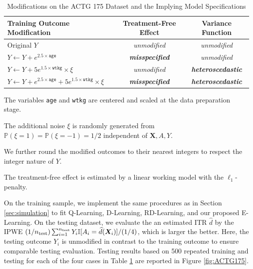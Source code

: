 \documentclass[11pt]{article}
\numberwithin{equation}{section}
\theoremstyle{definition}
\theoremstyle{remark}
\newcommand{\bX}{\bm{X}}
\newcommand{\bbI}{\mathbb{I}}
\newcommand{\bbP}{\mathbb{P}}
\newcommand{\bbone}{\bbI}	%
\begin{document}
\renewcommand{\arraystretch}{1}
\begin{table}[!ht]
	\centering
	\caption[ACTG 175, Modifications]{Modifications on the ACTG 175 Dataset and the Implying Model Specifications}
	\label{tab:ACTG175}
	\begin{threeparttable}
		\begin{tabular}{l|cc}
			\hline\hline
			\textbf{Training Outcome Modification} & \textbf{Treatment-Free Effect} & \textbf{Variance Function} \\
			\hline
			Original $ Y $ & \textit{unmodified} & \textit{unmodified} \\
			$ Y \gets Y + e^{2.5\times \texttt{age}} $ & \textbf{\textit{misspecified}} & \textit{unmodified} \\
			$ Y \gets Y + 5e^{1.5\times\texttt{wtkg}} \times \xi $ & \textit{unmodified} & \textbf{\textit{heteroscedastic}} \\
			$ Y \gets Y + e^{2.5\times \texttt{age}} + 5e^{1.5\times\texttt{wtkg}} \times \xi $ & \textbf{\textit{misspecified}} & \textbf{\textit{heteroscedastic}} \\
			\hline\hline
		\end{tabular}
		\begin{tablenotes}
			\fontsize{8}{5}\selectfont
			\item[1] The variables \texttt{age} and \texttt{wtkg} are centered and scaled at the data preparation stage. 
			\item[2] The additional noise $ \xi $ is randomly generated from $ \bbP(\xi = 1) = \bbP(\xi = -1) = 1/2 $ independent of $ \bX,A,Y $. 
			\item[3] We further round the modified outcomes to their nearest integers to respect the integer nature of $ Y $. 
			\item[4] The treatment-free effect is estimated by a linear working model with the $ \ell_{1} $-penalty.
		\end{tablenotes}
	\end{threeparttable}
\end{table}

On the training sample, we implement the same procedures as in Section \ref{sec:simulation} to fit Q-Learning, D-Learning, RD-Learning, and our proposed E-Learning. On the testing dataset, we evaluate the an estimated ITR $ \widehat{d} $ by the IPWE $ (1/n_{\rm test})\sum_{i=1}^{n_{\rm test}}Y_{i}\bbone[A_{i} = \widehat{d}(\bX_{i})]/(1/4) $, which is larger the better. Here, the testing outcome $ Y_{i} $ is unmodified in contrast to the training outcome to ensure comparable testing evaluation. Testing results based on 500 repeated training and testing for each of the four cases in Table \ref{tab:ACTG175} are reported in Figure \ref{fig:ACTG175}.
\end{document}
